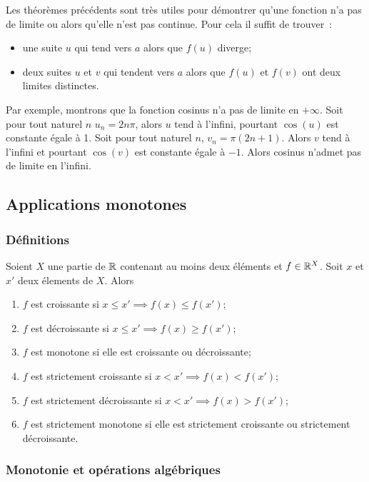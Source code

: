 Les théorèmes précédents sont très utiles pour démontrer qu'une fonction n'a pas de limite ou alors qu'elle n'est pas continue. Pour cela il suffit de trouver~:
\begin{itemize}
\item une suite $u$ qui tend vers $a$ alors que $f(u)$ diverge;
\item deux suites $u$ et $v$ qui tendent vers $a$ alors que $f(u)$ et $f(v)$ ont deux limites distinctes.
\end{itemize}

Par exemple, montrons que la fonction cosinus n'a pas de limite en $+\infty$. Soit pour tout naturel $n$ $u_n=2n\pi$, alors $u$ tend à l'infini, pourtant $\cos(u)$ est constante égale à 1. Soit pour tout naturel $n$, $v_n=\pi(2n+1)$. Alors $v$ tend à l'infini et pourtant $\cos(v)$ est constante égale à $-1$. Alors cosinus n'admet pas de limite en l'infini.

\subsection{Applications monotones}

\subsubsection{Définitions}

Soient $X$ une partie de $\mathbb{R}$ contenant au moins deux éléments et $f \in \mathbb{R}^X$. Soit $x$ et $x'$ deux élements de $X$. Alors
\begin{enumerate}
\item $f$ est croissante si $x \leq x' \implies f(x) \leq f(x')$;
\item $f$ est décroissante si $x \leq x' \implies f(x) \geq f(x')$;
\item $f$ est monotone si elle est croissante ou décroissante;
\item $f$ est strictement croissante si $x < x' \implies f(x) < f(x')$;
\item $f$ est strictement décroissante si $x < x' \implies f(x) > f(x')$;
\item $f$ est strictement monotone si elle est strictement croissante ou strictement décroissante.
\end{enumerate}

\subsubsection{Monotonie et opérations algébriques}

